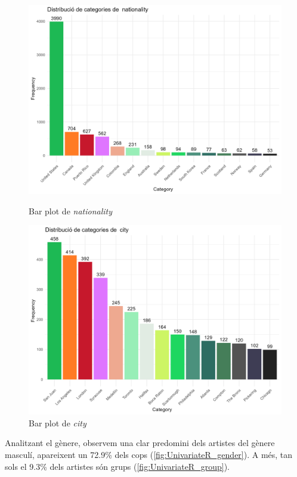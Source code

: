 \begin{figure}[H]
\centering
    \begin{minipage}{.4\textwidth}
        \centering
        \includegraphics[width=0.95\linewidth]{Images/2_Univariate/bar_nationality.png}
        \caption{Bar plot de \textit{nationality}}
        \label{fig:UnivariateR_nationality}
    \end{minipage}%
    \begin{minipage}{.4\textwidth}
        \centering
        \includegraphics[width=0.95\linewidth]{Images/2_Univariate/bar_city.png}
        \caption{Bar plot de \textit{city}}
        \label{fig:UnivariateR_city}
    \end{minipage}%
\end{figure}

Analitzant el gènere, observem una clar predomini dels artistes del gènere masculí, apareixent un 72.9\% dels cops (\ref{fig:UnivariateR_gender}). A més, tan sols el 9.3\% dels artistes són grups (\ref{fig:UnivariateR_group}).

